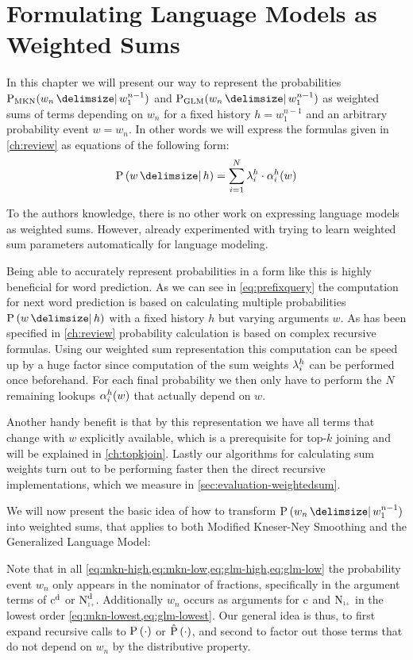 \chapter{Formulating Language Models as Weighted Sums}
\label{ch:weightedsum}

In this chapter we will present our way to represent the probabilities
$\ProbMKN{w_n}{w_1^{n-1}}$ and $\ProbGLM{w_n}{w_1^{n-1}}$ as weighted sums of
terms depending on $w_n$ for a fixed history $h = w_1^{n-1}$ and an  arbitrary
probability event $w = w_n$.
In other words we will express the formulas given in \cref{ch:review} as
equations of the following form:
\begin{equation}
  \label{eq:weightedsum}
  \Prob{w}{h} = \sum_{i = 1}^{N} \SumWeight_i^h \cdot \SumArg_i^h(w)
\end{equation}

To the authors knowledge, there is no other work on expressing language models
as weighted sums.
However, \textcite{JelinekMercer1980} already experimented with trying to learn
weighted sum parameters automatically for language modeling.

Being able to accurately represent probabilities in a form like this is highly
beneficial for word prediction.
As we can see in \cref{eq:prefixquery} the computation for next word prediction
is based on calculating multiple probabilities $\Prob{w}{h}$ with a fixed
history $h$ but varying arguments $w$.
As has been specified in \cref{ch:review} probability calculation is based on
complex recursive formulas.
Using our weighted sum representation this computation can be speed up by
a huge factor since computation of the sum weights $\lambda^h_i$ can
be performed once beforehand.
For each final probability we then only have to perform the $N$ remaining
lookups $\alpha^h_i(w)$ that actually depend on $w$.

Another handy benefit is that by this representation we have all terms that
change with $w$ explicitly available, which is a prerequisite for top-$k$
joining and will be explained in \cref{ch:topkjoin}.
Lastly our algorithms for calculating sum weights turn out to be performing
faster then the direct recursive implementations, which we measure in
\cref{sec:evaluation-weightedsum}.

We will now present the basic idea of how to transform $\Prob{w_n}{w_1^{n-1}}$
into weighted sums, that applies to both Modified Kneser-Ney Smoothing and
the Generalized Language Model:

Note that in all \cref{eq:mkn-high,eq:mkn-low,eq:glm-high,eq:glm-low} the
probability event $w_n$ only appears in the nominator of fractions, specifically
in the argument terms of $\DiscountedCount$ or $\DiscountedCount*$.
Additionally $w_n$ occurs as arguments for $\operatorname{c}$ and $\ContCountIp$ in the
lowest order \cref{eq:mkn-lowest,eq:glm-lowest}.
Our general idea is thus, to first expand recursive calls to
$\Prob(\DummyArg)$ or $\Prob*(\DummyArg)$, and second to factor
out those terms that do not depend on $w_n$ by the distributive property.

